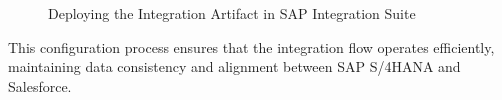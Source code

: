     \begin{figure}[H]
    \centering
    \caption{Deploying the Integration Artifact in SAP Integration Suite}
    
    \end{figure}


This configuration process ensures that the integration flow operates efficiently, maintaining data consistency and alignment between SAP S/4HANA and Salesforce.




\newpage